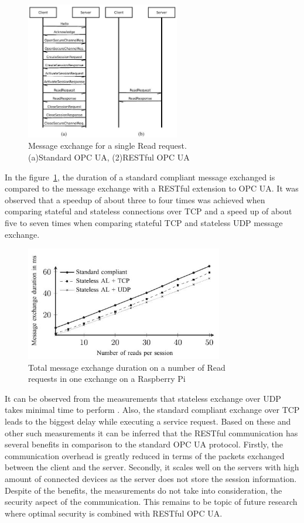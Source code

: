 \documentclass[conference]{IEEEtran}
\begin{document}
\begin{figure}[ht]
\centering
\includegraphics[height=60mm]{Figures/REST1}\quad
\caption[Subfigure example]{\label{f:REST1}Message exchange for a single Read request. \\(a)Standard OPC UA, (2)RESTful OPC UA}
\end{figure}


In the figure~\ref{f:REST1}, the duration of a standard compliant message exchanged is compared to the message exchange with a RESTful extension to OPC UA. It was observed that a speedup of about three to four times was achieved when comparing stateful and stateless connections over TCP and a speed up of about five to seven times when comparing stateful TCP and stateless UDP message exchange.  

\begin{figure}[ht]
\centering
\includegraphics[height=50mm]{Figures/REST2}\quad
\caption[Subfigure example]{\label{f:REST2}Total message exchange duration on a number of Read\\ requests in one exchange on a Raspberry Pi}
\end{figure}

It can be observed from the measurements that stateless exchange over UDP takes minimal time to perform \cite{gruner2016restful}. Also, the standard compliant exchange over TCP leads to the biggest delay while executing a service request.	Based on these and other such measurements it can be inferred that the RESTful communication has several benefits in comparison to the standard OPC UA protocol. Firstly, the communication overhead is greatly reduced in terms of the packets exchanged between the client and the server. Secondly, it scales well on the servers with high amount of connected devices as the server does not store the session information. Despite of the benefits, the measurements do not take into consideration, the security aspect of the communication. This remains to be topic of future research where optimal security is combined with RESTful OPC UA.  
\end{document}
